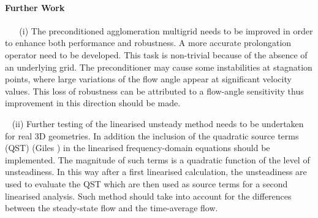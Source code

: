 \paragraph{Further Work}

~\newline
~\newline
 (i) The preconditioned agglomeration multigrid needs to be improved in order to
 enhance both performance and robustness. A more accurate prolongation operator
 need to be developed. This task is non-trivial because of the absence
 of an underlying grid. The preconditioner may cause some instabilities
 at stagnation points, where large variations of the flow angle appear
 at significant velocity values. This loss of robustness can be attributed to
 a flow-angle sensitivity thus improvement in this direction should be made.

~\newline
 (ii) Further testing of the linearised unsteady method needs to be undertaken for
 real 3D geometries. In addition the inclusion of the quadratic source
 terms (QST) (Giles ) in the linearised frequency-domain equations
 should be implemented.
 The magnitude of such terms is a quadratic function of the level of unsteadiness.
 In this way after a first linearised calculation, the unsteadiness are used to evaluate
 the QST which are then used as source terms for a second linearised analysis.
 Such method should take into account for the differences between the steady-state flow
 and the time-average flow.
%
